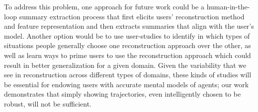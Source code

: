 \documentclass{article}
\begin{document}
To address this problem, one approach for future work could be a human-in-the-loop summary extraction process that first elicits users' reconstruction method and feature representation and then extracts summaries that align with the user's model. Another option would be to use user-studies to identify in which types of situations people generally choose one reconstruction approach over the other, as well as learn ways to prime users to use the reconstruction approach which could result in better generalization for a given domain. Given the variability that we see in reconstruction across different types of domains, these kinds of studies will be essential for endowing users with accurate mental models of agents; our work demonstrates that simply showing trajectories, even intelligently chosen to be robust, will not be sufficient.


\small


\end{document}
